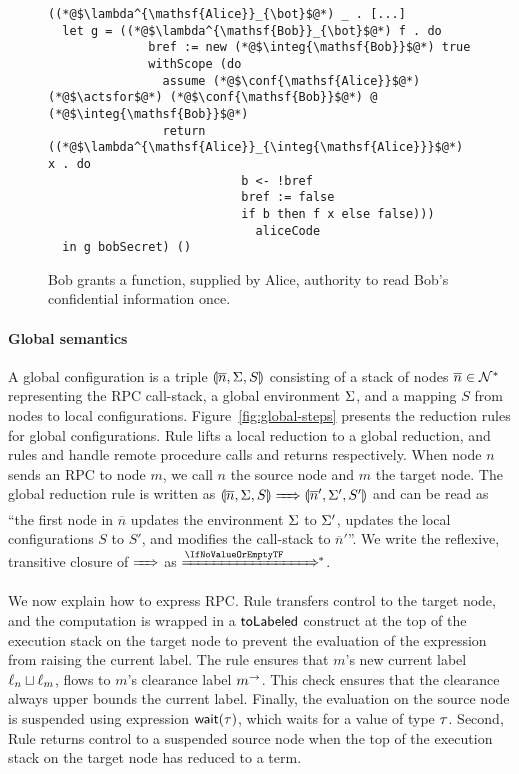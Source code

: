 \begin{figure}
\centering
\begin{lstlisting}
((*@$\lambda^{\mathsf{Alice}}_{\bot}$@*) _ . [...]
  let g = ((*@$\lambda^{\mathsf{Bob}}_{\bot}$@*) f . do
              bref := new (*@$\integ{\mathsf{Bob}}$@*) true
              withScope (do
                assume (*@$\conf{\mathsf{Alice}}$@*) (*@$\actsfor$@*) (*@$\conf{\mathsf{Bob}}$@*) @ (*@$\integ{\mathsf{Bob}}$@*)
                return ((*@$\lambda^{\mathsf{Alice}}_{\integ{\mathsf{Alice}}}$@*) x . do
                           b <- !bref
                           bref := false
                           if b then f x else false)))
                             aliceCode
  in g bobSecret) ()
\end{lstlisting}
\caption{Bob grants a function, supplied by Alice, authority to read Bob's confidential information once. }
\label{fig:use-case-for-fluid-scope}
\end{figure}

\paragraph{Global semantics}
A global configuration is a triple $\llparenthesis \overline{n}, \Sigma, S \rrparenthesis$ consisting of a stack of nodes $\overline{n} \in \mathcal{N}^*$ representing the RPC call-stack, a global environment $\Sigma$, and a mapping $S$ from nodes to local configurations. Figure~\ref{fig:global-steps} presents the reduction rules for global configurations. Rule  lifts a local reduction to a global reduction, and rules  and  handle remote procedure calls and returns respectively. When node $n$ sends an RPC to node $m$, we call $n$ the source node and $m$ the target node. The global reduction rule is written as $\gconfig{\overline{n}}{\env}{S} \gstepsto \gconfig{\overline{n}'}{\env'}{S'}$ and can be read as ``the first node in $\overline{n}$ updates the environment $\Sigma$ to $\Sigma'$, updates the local configurations $S$ to $S'$, and modifies the call-stack to $\overline{n}'$''. We write the reflexive, transitive closure of $\gstepsto$ as $\gstepstos$.

We now explain how to express RPC. Rule  transfers control to the target node, and the computation is wrapped in a $\mathsf{toLabeled}$ construct at the top of the execution stack on the target node to prevent the evaluation of the expression from raising the current label.
The rule ensures that $m$'s new current label $\ell_n \sqcup \ell_m$, flows to $m$'s clearance label $m^{\rightarrow}$. This check ensures that the clearance always upper bounds the current label.
Finally, the evaluation on the source node is suspended using expression $\wait[\type]$, which waits for a value of type $\tau$. Second, Rule  returns control to a suspended source node when the top of the execution stack on the target node has reduced to a term.

